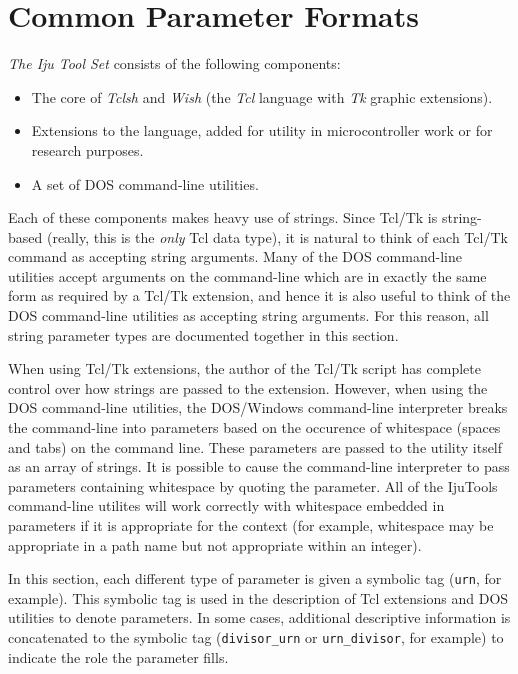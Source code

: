 \section{Common Parameter Formats}
\label{ctin0:sccl0}

\emph{The Iju Tool Set} consists of the following components:

\begin{itemize}
\item The core of \emph{Tclsh} and \emph{Wish} (the \emph{Tcl}
      language with \emph{Tk} graphic extensions).

\item Extensions to the language, added for utility in microcontroller
      work or for research purposes.

\item A set of DOS command-line utilities.
\end{itemize}

Each of these components makes heavy use of strings.  Since Tcl/Tk is 
string-based (really, this is the \emph{only} Tcl data type), it is natural
to think of each Tcl/Tk command as accepting string arguments.  Many of the
DOS command-line utilities accept arguments on the command-line which are
in exactly the same form as required by a Tcl/Tk extension, and hence
it is also useful to think of the DOS command-line utilities as 
accepting string arguments.  For this reason, all string parameter types
are documented together in this section.

When using Tcl/Tk extensions, the author of the Tcl/Tk script
has complete control over how strings are passed to the extension.
However, when using the DOS command-line utilities,
the DOS/Windows command-line
interpreter breaks the command-line into parameters based on the 
occurence of whitespace (spaces and tabs) on the command line.  These
parameters are passed to the utility itself as an array of strings.
It is possible to cause the command-line interpreter to pass parameters
containing whitespace by quoting the parameter.  All of the IjuTools
command-line utilites will work correctly with whitespace embedded in
parameters if it is appropriate for the context (for example, whitespace
may be appropriate in a path name but not appropriate within an integer).

In this section, each different type of parameter is given a symbolic
tag (\texttt{urn}, for example).  This symbolic tag is used in the description
of Tcl extensions and DOS utilities to denote parameters.  In some cases,
additional descriptive information is concatenated to the symbolic 
tag (\texttt{divisor\_urn} or \texttt{urn\_divisor}, for example) to
indicate the role the parameter fills.


